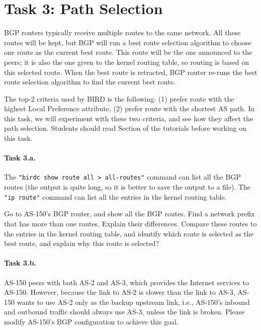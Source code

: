 \section{Task 3: Path Selection} 

BGP routers typically receive multiple routes to the same network. 
All these routes will be kept, but BGP will run a best route 
selection algorithm to choose one route as the current best route. 
This route will be the one announced to the peers; 
it is also the one given to the kernel routing table, 
so routing is based on this selected route. 
When the best route is retracted, BGP router re-runs the 
best route selection algorithm to find the current best route. 

The top-2 criteria used by BIRD is the following:
(1) prefer route with the highest Local Preference attribute,
(2) prefer route with the shortest AS path. In this task, we will
experiment with these two criteria, and see how they affect 
the path selection. Students should read Section \pathselection 
of the tutorials before working on this task.


\paragraph{Task 3.a.} The \texttt{"birdc show route all > all-routes"} command
can list all the BGP routes (the output is quite long, so it is better to
save the output to a file). The \texttt{"ip route"} command
can list all the entries in the kernel routing table. 

Go to AS-150's BGP router, and show all the BGP routes. Find a network prefix
that has more than one routes. Explain their differences. Compare these 
routes to the entries in the kernel routing table, and identify which route is 
selected as the best route, and explain why this route is selected? 


\paragraph{Task 3.b.}
AS-150 peers with both AS-2 and AS-3, which provides the 
Internet services to AS-150.
However, because the link to AS-2 is slower than
the link to AS-3, AS-150 wants 
to use AS-2 only as the backup upstream link, i.e., 
AS-150's inbound and outbound traffic should 
always use AS-3, unless the link is broken. 
Please modify AS-150's BGP configuration to achieve this goal.



